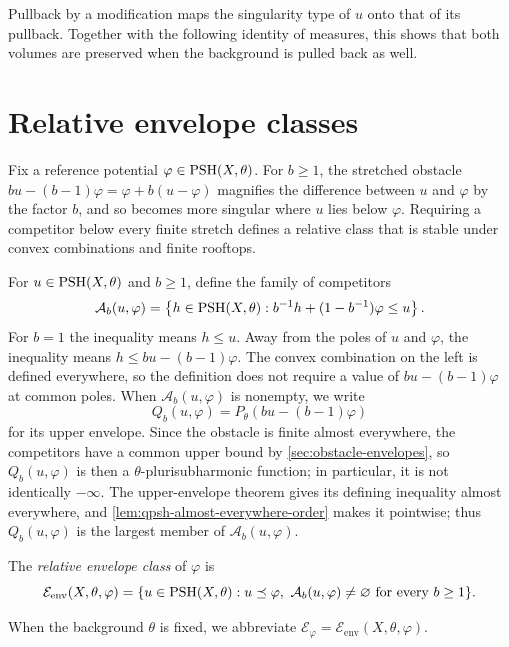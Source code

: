 Pullback by a modification maps the singularity type of $u$ onto that of its pullback. Together with the following identity of measures, this shows that both volumes are preserved when the background is pulled back as well.



\section{Relative envelope classes}

Fix a reference potential $\varphi\in\mathrm{PSH}(X,\theta)$. For $b\geq1$, the stretched obstacle $bu-(b-1)\varphi=\varphi+b(u-\varphi)$ magnifies the difference between $u$ and $\varphi$ by the factor $b$, and so becomes more singular where $u$ lies below $\varphi$. Requiring a competitor below every finite stretch defines a relative class that is stable under convex combinations and finite rooftops.

For $u\in\mathrm{PSH}(X,\theta)$ and $b\geq1$, define the family of competitors
\[
 \mathcal A_b(u,\varphi)=
 \left\{h\in\mathrm{PSH}(X,\theta):
 b^{-1}h+(1-b^{-1})\varphi\leq u\right\}.
\]
For $b=1$ the inequality means $h\leq u$. Away from the poles of $u$ and $\varphi$, the inequality means $h\leq bu-(b-1)\varphi$. The convex combination on the left is defined everywhere, so the definition does not require a value of $bu-(b-1)\varphi$ at common poles. When $\mathcal A_b(u,\varphi)$ is nonempty, we write
\[
 Q_b(u,\varphi)=P_\theta(bu-(b-1)\varphi)
\]
for its upper envelope. Since the obstacle is finite almost everywhere, the competitors have a common upper bound by \cref{sec:obstacle-envelopes}, so $Q_b(u,\varphi)$ is then a $\theta$-plurisubharmonic function; in particular, it is not identically $-\infty$. The upper-envelope theorem gives its defining inequality almost everywhere, and \cref{lem:qpsh-almost-everywhere-order} makes it pointwise; thus $Q_b(u,\varphi)$ is the largest member of $\mathcal A_b(u,\varphi)$.

\begin{definition}\label{def:relative-envelope-class}
The \emph{relative envelope class} of $\varphi$ is
\[
 \mathcal E_{\mathrm{env}}(X,\theta,\varphi)
 =\{u\in\mathrm{PSH}(X,\theta):u\preceq\varphi,
       \ \mathcal A_b(u,\varphi)\ne\varnothing
       \text{ for every }b\geq1\}.
\]
\end{definition}

When the background $\theta$ is fixed, we abbreviate $\mathcal E_\varphi=\mathcal E_{\mathrm{env}}(X,\theta,\varphi)$.

